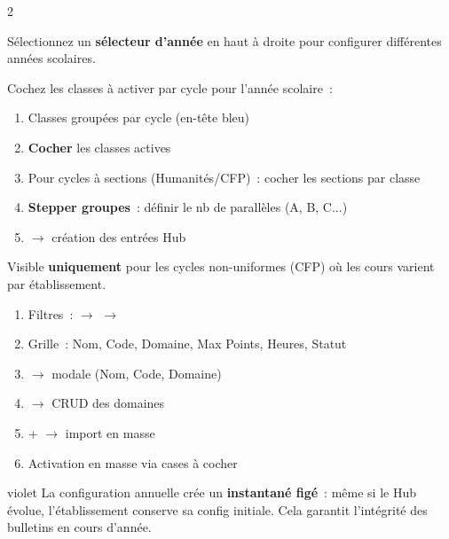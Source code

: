 \begin{multicols}{2}
\begin{tipbox}
\scriptsize S\'electionnez un \textbf{s\'electeur d'ann\'ee} en haut \`a droite pour configurer diff\'erentes ann\'ees scolaires.
\end{tipbox}


{\scriptsize Cochez les classes \`a activer par cycle pour l'ann\'ee scolaire~:}

\begin{stepbox}[title={\faCheck\ Configurer les classes}]
\begin{enumerate}[label=\textcolor{indigo}{\scriptsize\textbf{\arabic*.}},font=\scriptsize,itemsep=0pt]
  \item Classes group\'ees par cycle (en-t\^ete bleu)
  \item \textbf{Cocher} les classes actives
  \item Pour cycles \`a sections (Humanit\'es/CFP)~: cocher les sections par classe
  \item \textbf{Stepper groupes}~: d\'efinir le nb de parall\`eles (A, B, C...)
  \item {} $\to$ cr\'eation des entr\'ees Hub
\end{enumerate}
\end{stepbox}


{\scriptsize Visible \textbf{uniquement} pour les cycles non-uniformes (CFP) o\`u les cours varient par \'etablissement.}

\begin{stepbox}[title={\faBook\ G\'erer les cours}]
\begin{enumerate}[label=\textcolor{indigo}{\scriptsize\textbf{\arabic*.}},font=\scriptsize,itemsep=0pt]
  \item Filtres~:  $\to$  $\to$ 
  \item Grille~: Nom, Code, Domaine, Max Points, Heures, Statut
  \item {} $\to$ modale (Nom, Code, Domaine)
  \item {} $\to$ CRUD des domaines
  \item {} +  $\to$ import en masse
  \item Activation en masse via cases \`a cocher
\end{enumerate}
\end{stepbox}

\begin{cbox}[title={\faGavel\ Gouvernance}]{violet}
\scriptsize La configuration annuelle cr\'ee un \textbf{instantan\'e fig\'e}~: m\^eme si le Hub \'evolue, l'\'etablissement conserve sa config initiale. Cela garantit l'int\'egrit\'e des bulletins en cours d'ann\'ee.
\end{cbox}

\end{multicols}

